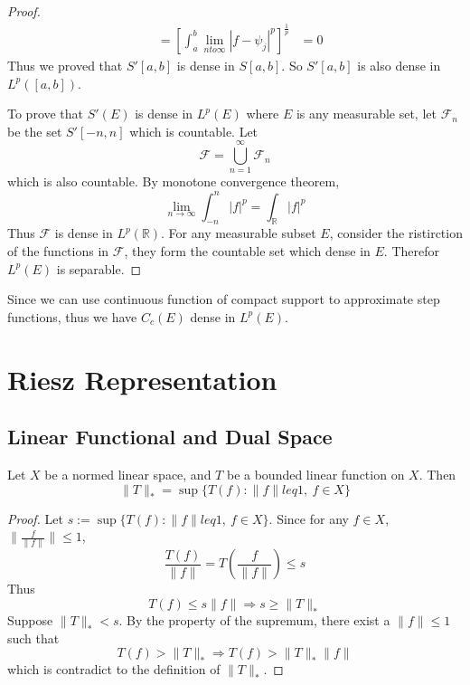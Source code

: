\documentclass[lang=en, 12pt]{elegantbook}
\newcommand{\RR}{\mathbb{R}}
\begin{document}
\begin{proof}
\begin{equation*}
\begin{aligned}
                &=  [\int_a^b \lim_{n to \infty} |f-\psi_j|^p]^{\frac{1}{p}} 
                &= 0
            \end{aligned}
        \end{equation*}
            Thus we proved that $S'[a,b]$ is dense in $S[a,b]$. So $S'[a,b]$ is also dense in 
        $L^p([a,b])$.\par 
            To prove that $S'(E)$ is dense in $L^p(E)$ where $E$ is any measurable set, let 
        $\mathcal{F}_n$ be the set $S'[-n, n]$ which is countable. Let 
        $$\mathcal{F} = \bigcup_{n=1}^{\infty} \mathcal{F}_n $$ 
        which is also countable. By monotone convergence theorem,
        $$\lim_{n \to \infty} \int_{-n}^n |f|^p = \int_{\RR} |f|^p$$
        Thus $\mathcal{F}$ is dense in $L^p(\RR)$. For any measurable subset $E$,
        consider the ristirction of the functions in $\mathcal{F}$, they form the countable 
        set which dense in $E$. Therefor $L^p(E)$ is separable.
        \end{proof}
        Since we can use continuous function of compact support to approximate step 
    functions, thus we have $C_c(E)$ dense in $L^p(E)$.
        
\chapter{Riesz Representation}
    \section{Linear Functional and Dual Space}
        \begin{definition}
            
        \end{definition}
    
        \begin{definition}
            
        \end{definition}

        \begin{proposition}
            Let $X$ be a normed linear space, and $T$ be a 
        bounded linear function on $X$. Then
        $$\lVert T \rVert_* = \sup\{T(f): \lVert f \rVert leq 1 , \ f \in X \} $$
        \end{proposition}
        \begin{proof}
            Let $s:=\sup\{T(f): \lVert f \rVert leq 1 , \ f \in X \} $. Since for 
        any $f \in X$, $\lVert \frac{f}{\lVert f \rVert}\rVert \leq 1$,
        $$\frac{T(f)}{\lVert f \rVert} = T(\frac{f}{\lVert f \rVert}) \leq s $$
        Thus 
        $$T(f) \leq s \lVert f \rVert \Rightarrow s \geq \lVert T \rVert_*$$
        Suppose $\lVert T \rVert_* < s$. By the property of the supremum,
        there exist a $\lVert f\rVert \leq 1$ such that
        $$T(f) > \lVert T \rVert_* \Rightarrow T(f) > \lVert T \rVert_* \lVert f\rVert$$
        which is contradict to the definition of $\lVert T \rVert_*$.
        \end{proof}
\end{document}

